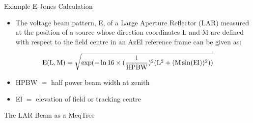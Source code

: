 \documentclass[pdf,azure,slideColor,colorBG]{prosper}
\begin{document}
\begin{slide}{Example E-Jones Calculation}
\begin{small}
\begin{itemize}
\item The voltage beam pattern, E, of a Large Aperture Reflector (LAR)
 measured at the position of a source
 whose direction coordinates L and M are defined with respect to the field 
 centre in an AzEl reference frame can be given as:
\end{itemize}
\begin{displaymath}
\rm E(L,M) = \sqrt{exp(-\ln16 \times (\frac{1}{\rm HPBW})^2(\rm L^2 + (        M \sin(\rm El))^2))}
\end{displaymath}
\begin{itemize}
\item HPBW $=$ half power beam width at zenith
\item El $=$ elevation of field or tracking centre
\end{itemize}
\end{small}
\end{slide}

\begin{slide}{The LAR Beam as a MeqTree}
{\centering
{}
\par}
\end{slide}
\end{document}
